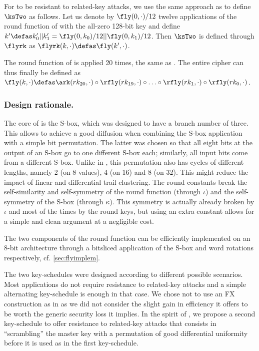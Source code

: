 \medskip

For \fly to be resistant to related-key attacks, we use the same approach as \noekeon \cite{noekeon} to define $\ksTwo$ as follows. Let us denote by $\fly(0, \cdot)/12$ twelve applications of the round function of \fly
with the all-zero 128-bit key and define $k' \defas k_0'||k_1' = \fly(0, k_0)/12||\fly(0, k_1)/12$. Then $\ksTwo$ is defined through $\flyrk$ as $\flyrk(k, \cdot) \defas \fly(k', \cdot)$. 

\medskip

The round function of \fly is applied 20 times, the same as \pride. The entire cipher can thus finally be defined
as $\fly(k,\cdot) \defas \ark(rk_{20},\cdot) \circ \rfly(rk_{19}, \cdot) \circ \ldots \circ \rfly(rk_1, \cdot) \circ \rfly(rk_0,\cdot)$.


\subsubsection*{Design rationale.}
The core of \fly is the \littlunOne S-box, which was designed to have a branch number of three. This allows to achieve a good diffusion when combining the S-box
application with a simple bit permutation. The latter was chosen so that all eight bits at the output of an S-box go to one different S-box each; similarly, all
input bits come from a different S-box. Unlike in \present, this permutation also has cycles of different lengths,
namely 2 (on 8 values), 4 (on 16) and 8 (on 32). This might reduce the impact of linear and differential trail clustering.
The round constants break the self-similarity and self-symmetry of the round function (through $\iota$)
and the self-symmetry of the S-box (through $\kappa$). This symmetry is actually already broken by $\iota$ and most of the times by the round keys, but using an
extra constant allows for a simple and clean argument at a negligible cost.

The two components of the round function can be efficiently implemented on an 8-bit architecture through a bitsliced
application of the S-box and word rotations respectively, cf. \autoref{sec:flyimplem}.

The two key-schedules were designed according to different possible scenarios. Most applications do not require resistance to related-key attacks and a simple
alternating key-schedule is enough in that case. We chose not to use an FX construction as in \pride as we did not consider the slight gain in efficiency
it offers to be worth the generic security loss it implies. In the spirit of \noekeon, we propose a second key-schedule to offer resistance to related-key attacks
that consists in ``scrambling'' the master key with a permutation of good differential uniformity before it is used as in the first key-schedule.

